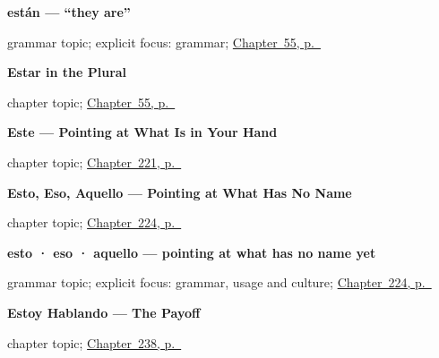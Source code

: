 \noindent\begin{minipage}[t]{\linewidth}
\raggedright
\textbf{están — \textquotedblleft{}they are\textquotedblright{}}\par
\footnotesize grammar topic; explicit focus: grammar; \hyperref[ch:spanish-estar-plural]{Chapter~55, p.~\pageref*{ch:spanish-estar-plural}}
\end{minipage}\par\smallskip

\noindent\begin{minipage}[t]{\linewidth}
\raggedright
\textbf{Estar in the Plural}\par
\footnotesize chapter topic; \hyperref[ch:spanish-estar-plural]{Chapter~55, p.~\pageref*{ch:spanish-estar-plural}}
\end{minipage}\par\smallskip

\noindent\begin{minipage}[t]{\linewidth}
\raggedright
\textbf{Este --- Pointing at What Is in Your Hand}\par
\footnotesize chapter topic; \hyperref[ch:este]{Chapter~221, p.~\pageref*{ch:este}}
\end{minipage}\par\smallskip

\noindent\begin{minipage}[t]{\linewidth}
\raggedright
\textbf{Esto, Eso, Aquello --- Pointing at What Has No Name}\par
\footnotesize chapter topic; \hyperref[ch:esto-eso-aquello]{Chapter~224, p.~\pageref*{ch:esto-eso-aquello}}
\end{minipage}\par\smallskip

\noindent\begin{minipage}[t]{\linewidth}
\raggedright
\textbf{esto · eso · aquello — pointing at what has no name yet}\par
\footnotesize grammar topic; explicit focus: grammar, usage and culture; \hyperref[ch:esto-eso-aquello]{Chapter~224, p.~\pageref*{ch:esto-eso-aquello}}
\end{minipage}\par\smallskip

\noindent\begin{minipage}[t]{\linewidth}
\raggedright
\textbf{Estoy Hablando --- The Payoff}\par
\footnotesize chapter topic; \hyperref[ch:estoy-hablando]{Chapter~238, p.~\pageref*{ch:estoy-hablando}}
\end{minipage}\par\smallskip

